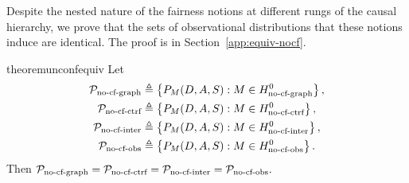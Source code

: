 Despite the nested nature of the fairness notions at different rungs of the causal hierarchy, we prove that the sets of observational distributions that these notions induce are identical. The proof is in Section~\ref{app:equiv-nocf}.
\begin{restatable}{theorem}{unconfequiv}\label{thm:unconf_test_equiv}
Let
\begin{align*} 
{\cal P}_{\text{no-cf-graph}} &\triangleq \left \lbrace P_{M}{\left({D,A, S}\right)} : M \in H^0_{\text{no-cf-graph}} \right \rbrace, \\
{\cal P}_{\text{no-cf-ctrf}} &\triangleq \left \lbrace P_{M}{\left({D,A, S}\right)} : M \in H^0_{\text{no-cf-ctrf}} \right \rbrace, \\
{\cal P}_{\text{no-cf-inter}} &\triangleq \left \lbrace P_{M}{\left({D,A, S}\right)} : M \in H^0_{\text{no-cf-inter}} \right \rbrace, \\
{\cal P}_{\text{no-cf-obs}} &\triangleq \left \lbrace P_{M}{\left({D,A, S}\right)} : M \in H^0_{\text{no-cf-obs}} \right \rbrace.
\end{align*}
Then ${\cal P}_{\text{no-cf-graph}} = {\cal P}_{\text{no-cf-ctrf}} = {\cal P}_{\text{no-cf-inter}} = {\cal P}_{\text{no-cf-obs}}.$
\end{restatable}


